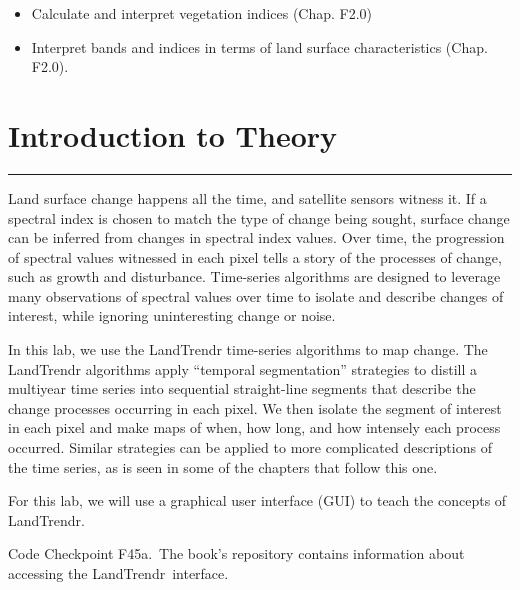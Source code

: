 \documentclass[
  letterpaper,
  DIV=11,
  numbers=noendperiod]{scrreprt}
\providecommand{\tightlist}{%
  \setlength{\itemsep}{0pt}\setlength{\parskip}{0pt}}\usepackage{longtable,booktabs,array}
\begin{document}

\begin{itemize}
\tightlist
\item
  Calculate and interpret vegetation indices (Chap. F2.0)
\item
  Interpret bands and indices in terms of land surface characteristics
  (Chap. F2.0).
\end{itemize}

\hypertarget{introduction-to-theory-7}{%
\section*{Introduction to Theory}\label{introduction-to-theory-7}}


\begin{center}\rule{0.5\linewidth}{0.5pt}\end{center}

Land surface change happens all the time, and satellite sensors witness
it. If a spectral index is chosen to match the type of change being
sought, surface change can be inferred from changes in spectral index
values. Over time, the progression of spectral values witnessed in each
pixel tells a story of the processes of change, such as growth and
disturbance. Time-series algorithms are designed to leverage many
observations of spectral values over time to isolate and describe
changes of interest, while ignoring uninteresting change or noise.

In this lab, we use the LandTrendr time-series algorithms to map change.
The LandTrendr algorithms apply ``temporal segmentation'' strategies to
distill a multiyear time series into sequential straight-line segments
that describe the change processes occurring in each pixel. We then
isolate the segment of interest in each pixel and make maps of when, how
long, and how intensely each process occurred. Similar strategies can be
applied to more complicated descriptions of the time series, as is seen
in some of the chapters that follow this one.

For this lab, we will use a graphical user interface (GUI) to teach the
concepts of LandTrendr.

\begin{tcolorbox}[enhanced jigsaw, left=2mm, breakable, rightrule=.15mm, opacityback=0, colframe=quarto-callout-note-color-frame, colbacktitle=quarto-callout-note-color!10!white, arc=.35mm, opacitybacktitle=0.6, toptitle=1mm, colback=white, leftrule=.75mm, title=\textcolor{quarto-callout-note-color}{\faInfo}\hspace{0.5em}{Note}, toprule=.15mm, bottomtitle=1mm, titlerule=0mm, bottomrule=.15mm, coltitle=black]

Code Checkpoint F45a.~The book's repository contains information about
accessing the LandTrendr~interface.

\end{tcolorbox}
\end{document}
